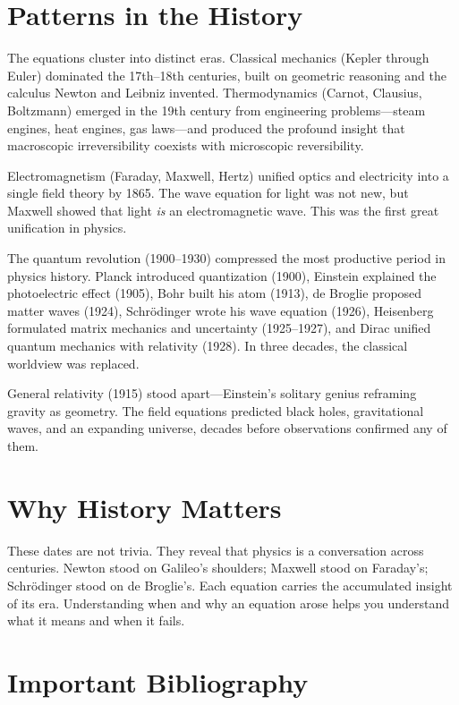 \section*{Patterns in the History}

The equations cluster into distinct eras. Classical mechanics (Kepler through Euler) dominated the 17th--18th centuries, built on geometric reasoning and the calculus Newton and Leibniz invented. Thermodynamics (Carnot, Clausius, Boltzmann) emerged in the 19th century from engineering problems---steam engines, heat engines, gas laws---and produced the profound insight that macroscopic irreversibility coexists with microscopic reversibility.

Electromagnetism (Faraday, Maxwell, Hertz) unified optics and electricity into a single field theory by 1865. The wave equation for light was not new, but Maxwell showed that light \textit{is} an electromagnetic wave. This was the first great unification in physics.

The quantum revolution (1900--1930) compressed the most productive period in physics history. Planck introduced quantization (1900), Einstein explained the photoelectric effect (1905), Bohr built his atom (1913), de Broglie proposed matter waves (1924), Schr\"odinger wrote his wave equation (1926), Heisenberg formulated matrix mechanics and uncertainty (1925--1927), and Dirac unified quantum mechanics with relativity (1928). In three decades, the classical worldview was replaced.

General relativity (1915) stood apart---Einstein's solitary genius reframing gravity as geometry. The field equations predicted black holes, gravitational waves, and an expanding universe, decades before observations confirmed any of them.

\section*{Why History Matters}

These dates are not trivia. They reveal that physics is a conversation across centuries. Newton stood on Galileo's shoulders; Maxwell stood on Faraday's; Schr\"odinger stood on de Broglie's. Each equation carries the accumulated insight of its era. Understanding when and why an equation arose helps you understand what it means and when it fails.

\section*{Important Bibliography}

